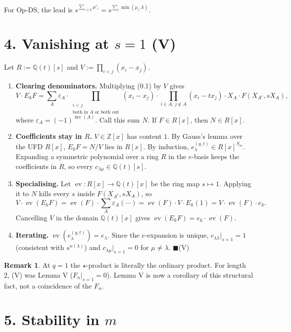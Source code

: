 \documentclass[11pt]{article}
\theoremstyle{definition}
\newtheorem*{remark}{Remark}
\newcommand{\Q}{\mathbb{Q}}
\newcommand{\Z}{\mathbb{Z}}
\newcommand{\inv}{\operatorname{inv}}
\newcommand{\ev}{\operatorname{ev}}
\begin{document}
\smallskip
For Op-DS, the lead is $s^{\sum_{i\le k} \mu'_i} = s^{\sum_i \min(\mu_i,k)}$.

\section*{4. Vanishing at $s = 1$ (V)}

Let $R := \Q(t)[s]$ and $V := \prod_{i<j}(x_i - x_j)$.
\begin{enumerate}
\item \textbf{Clearing denominators.} Multiplying (0.1) by $V$ gives
\[
V\cdot E_kF = \sum_A \varepsilon_A \cdot \prod_{\substack{i<j\\ \text{both in } A \text{ or both out}}}(x_i - x_j) \cdot \prod_{i\in A,\, j\notin A}(x_i - t x_j) \cdot X_A \cdot F(X_{A^c}, sX_A),
\]
where $\varepsilon_A = (-1)^{\inv(A)}$. Call this sum $N$. If $F \in R[x]$, then $N \in R[x]$.
\item \textbf{Coefficients stay in $R$.} $V \in \Z[x]$ has content $1$. By Gauss's lemma over the UFD $R[x]$, $E_kF = N/V$ lies in $R[x]$. By induction, $e_\lambda^{(q,t)} \in R[x]^{S_m}$. Expanding a symmetric polynomial over a ring $R$ in the $e$-basis keeps the coefficients in $R$, so every $c_{\lambda\mu} \in \Q(t)[s]$.
\item \textbf{Specialising.} Let $\ev: R[x] \to \Q(t)[x]$ be the ring map $s \mapsto 1$. Applying it to $N$ kills every $s$ inside $F(X_{A^c}, sX_A)$, so
\[
V\cdot \ev(E_kF) = \ev(F) \cdot \sum_A \varepsilon_A(\cdots) = \ev(F) \cdot V\cdot E_k(1) = V\cdot\ev(F)\cdot e_k.
\]
Cancelling $V$ in the domain $\Q(t)[x]$ gives $\ev(E_kF) = e_k\cdot\ev(F)$.
\item \textbf{Iterating.} $\ev(e_\lambda^{(q,t)}) = e_\lambda$. Since the $e$-expansion is unique, $c_{\lambda\lambda}|_{s=1} = 1$ (consistent with $s^{n(\lambda)}$) and $c_{\lambda\mu}|_{s=1} = 0$ for $\mu \ne \lambda$. \hfill$\blacksquare$(V)
\end{enumerate}

\begin{remark}
At $q = 1$ the $\star$-product is literally the ordinary product. For length 2, (V) was Lemma V ($F_n|_{s=1} = 0$). Lemma V is now a corollary of this structural fact, not a coincidence of the $F_n$.
\end{remark}

\section*{5. Stability in $m$}
\end{document}
